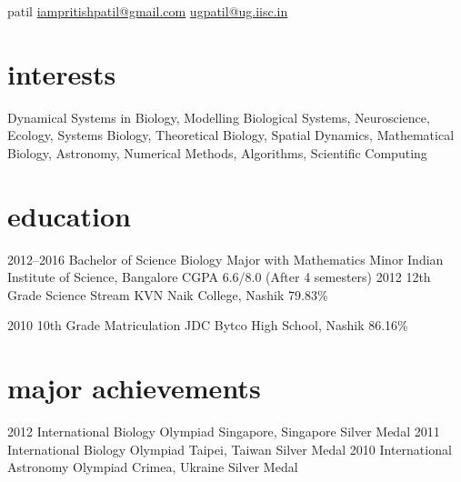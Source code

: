 \documentclass[11pt]{friggeri-cv}
\begin{document}
 {patil} 
        {\href{mailto:iampritishpatil@gmail.com}{iampritishpatil@gmail.com}\quad  
    \href{mailto:ugpatil@ug.iisc.in}{ugpatil@ug.iisc.in}
}



\section{interests}

Dynamical Systems in Biology, Modelling Biological Systems, Neuroscience, Ecology, Systems Biology, Theoretical Biology, Spatial Dynamics, Mathematical Biology, Astronomy, Numerical Methods, Algorithms, Scientific Computing

\section{education}

\begin{entrylist}
  \entryy
    {2012--2016}
    {Bachelor of Science {\normalfont Biology Major with Mathematics Minor }}
    {Indian Institute of Science, Bangalore}
    { CGPA 6.6/8.0  (After 4 semesters)}
  \entryy
    {2012}
    {12th Grade {\normalfont Science Stream}}
  {KVN Naik College, Nashik}
  { 79.83\%}
    
    
  \entryy
    {2010}
    {10th Grade     {\normalfont Matriculation}}
    {JDC Bytco High School, Nashik}
    {86.16\%}

\end{entrylist}


\section{major achievements}
\begin{entrylist}
  \entryy
    {2012}
    {International Biology Olympiad}
    {Singapore, Singapore}
    {Silver Medal}
  \entryy
    {2011}
    {International Biology Olympiad}
    {Taipei, Taiwan}
    {Silver Medal}
  \entryy
    {2010}
    {International Astronomy Olympiad}
    {Crimea, Ukraine}
    {Silver Medal}



\end{entrylist}
\end{document}
